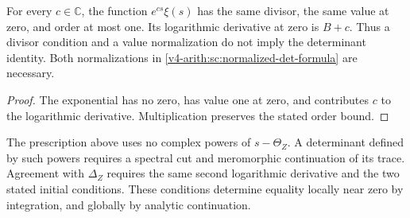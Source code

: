 \begin{proposition}
\label{v4-arith:sc:det-ambiguity}
For every $c\in\mathbb C$, the function $e^{cs}\xi(s)$ has the same
divisor, the same value at zero, and order at most one.
Its logarithmic derivative at zero is $B+c$.
Thus a divisor condition and a value normalization do not imply
the determinant identity. Both normalizations in
\eqref{v4-arith:sc:normalized-det-formula} are necessary.
\end{proposition}
\begin{proof}
The exponential has no zero, has value one at zero, and contributes
$c$ to the logarithmic derivative. Multiplication preserves the
stated order bound.
\end{proof}

The prescription above uses no complex powers of $s-\Theta_Z$.
A determinant defined by such powers requires a spectral cut and
meromorphic continuation of its trace. Agreement with $\Delta_Z$
requires the same second logarithmic derivative and the two stated
initial conditions. These conditions determine equality locally
near zero by integration, and globally by analytic continuation.
